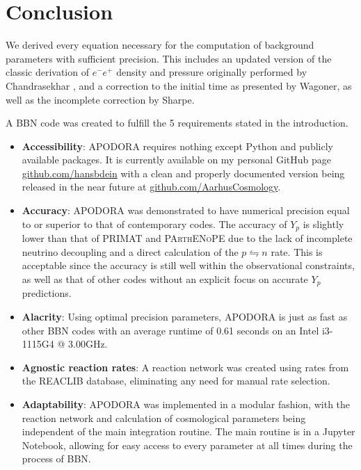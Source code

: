 








\chapter{Conclusion}
\label{chap:Conclusion}

We derived every equation necessary for the computation of background parameters with sufficient precision. This includes an updated version of the classic derivation of $e^{-}e^{+}$ density and pressure originally performed by Chandrasekhar \cite{Chandrasekhar}, and a correction to the initial time as presented by Wagoner\cite{Wagoner67}, as well as the incomplete correction by Sharpe\cite{sharpe2021big}. 

\noindent A BBN code was created to fulfill the 5 requirements stated in the introduction.
\begin{itemize}
    \item \textbf{Accessibility}: APODORA requires nothing except Python and publicly available packages. It is currently available on my personal GitHub page \url{github.com/hansbdein} with a clean and properly documented version being released in the near future at \url{github.com/AarhusCosmology}.
    \item \textbf{Accuracy}: APODORA was demonstrated to have numerical precision equal to or superior to that of contemporary codes. The accuracy of $Y_p$ is slightly lower than that of PRIMAT and \textsc{PArthENoPE} due to the lack of incomplete neutrino decoupling and a direct calculation of the $p\leftrightharpoons n$ rate. This is acceptable since the accuracy is still well within the observational constraints, as well as that of other codes without an explicit focus on accurate $Y_p$ predictions.
    \item \textbf{Alacrity}: Using optimal precision parameters, APODORA is just as fast as other BBN codes with an average runtime of 0.61 seconds on an Intel i3-1115G4 @ 3.00GHz.
    \item \textbf{Agnostic reaction rates}: A reaction network was created using rates from the REACLIB database\cite{REACLIB}, eliminating any need for manual rate selection.
    \item \textbf{Adaptability}: APODORA was implemented in a modular fashion, with the reaction network and calculation of cosmological parameters being independent of the main integration routine. The main routine is in a Jupyter Notebook, allowing for easy access to every parameter at all times during the process of BBN. 
\end{itemize}




